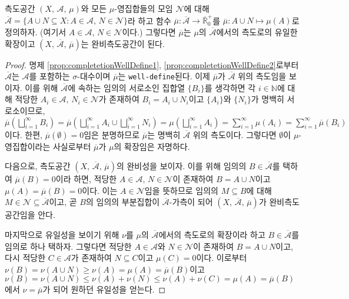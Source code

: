 \begin{theorem}\label{thm:measureCompletion}
    측도공간 $(X,\,\mathcal{A},\,\mu)$와 모든 $\mu$-영집합들의 모임 $\mathcal{N}$에 대해 $\overline{\mathcal{A}}=\{A\cup N\subseteq X:A\in\mathcal{A},\,N\in\mathcal{N}\}$라 하고 함수 $\overline{\mu}:\overline{\mathcal{A}}\to\overline{\mathbb{R}}^+_0$를 $\overline{\mu}:A\cup N\mapsto\mu(A)$로 정의하자. (여기서 $A\in\mathcal{A},\,N\in\mathcal{N}$이다.) 그렇다면 $\overline{\mu}$는 $\mu$의 $\overline{\mathcal{A}}$에서의 측도로의 유일한 확장이고 $(X,\,\overline{\mathcal{A}},\,\overline{\mu})$는 완비측도공간이 된다.
\end{theorem}

\begin{proof}
    명제 \ref{prop:completetionWellDefine1}, \ref{prop:completetionWellDefine2}로부터 $\overline{\mathcal{A}}$는 $\mathcal{A}$를 포함하는 $\sigma$-대수이며 $\overline{\mu}$는 \texttt{well-define}된다. 이제 $\overline{\mu}$가 $\overline{\mathcal{A}}$ 위의 측도임을 보이자. 이를 위해 $\overline{\mathcal{A}}$에 속하는 임의의 서로소인 집합열 $\{B_i\}$를 생각하면 각 $i\in\mathbb{N}$에 대해 적당한 $A_i\in\mathcal{A},\,N_i\in\mathcal{N}$가 존재하여 $B_i=A_i\cup N_i$이고 $\{A_i\}$와 $\{N_i\}$가 명백히 서로소이므로, $\overline{\mu}(\bigsqcup_{i=1}^\infty B_i)=\overline{\mu}(\bigsqcup_{i=1}^\infty A_i\cup\bigsqcup_{i=1}^\infty N_i)=\mu(\bigsqcup_{i=1}^\infty A_i)=\sum_{i=1}^\infty\mu(A_i)=\sum_{i=1}^\infty\overline{\mu}(B_i)$이다. 한편, $\overline{\mu}(\emptyset)=0$임은 분명하므로 $\overline{\mu}$는 명백히  $\overline{\mathcal{A}}$ 위의 측도이다. 그렇다면 $\emptyset$이 $\mu$-영집합이라는 사실로부터  $\overline{\mu}$가 $\mu$의 확장임은 자명하다.

    다음으로, 측도공간 $(X,\,\overline{\mathcal{A}},\,\overline{\mu})$의 완비성을 보이자. 이를 위해 임의의 $B\in\overline{\mathcal{A}}$를 택하여 $\overline{\mu}(B)=0$이라 하면, 적당한 $A\in\mathcal{A},\,N\in\mathcal{N}$이 존재하여 $B=A\cup N$이고 $\mu(A)=\overline{\mu}(B)=0$이다. 이는 $A\in\mathcal{N}$임을 뜻하므로 임의의 $M\subseteq B$에 대해 $M\in\mathcal{N}\subseteq\overline{\mathcal{A}}$이고, 곧 $B$의 임의의 부분집합이 $\overline{\mathcal{A}}$-가측이 되어 $(X,\,\overline{\mathcal{A}},\,\overline{\mu})$가 완비측도공간임을 안다.

    마지막으로 유일성을 보이기 위해 $\nu$를 $\mu$의 $\overline{\mathcal{A}}$에서의 측도로의 확장이라 하고 $B\in\overline{\mathcal{A}}$를 임의로 하나 택하자. 그렇다면 적당한 $A\in\mathcal{A}$와 $N\in\mathcal{N}$이 존재하여 $B=A\cup N$이고, 다시 적당한 $C\in\mathcal{A}$가 존재하여 $N\subseteq C$이고 $\mu(C)=0$이다. 이로부터 $\nu(B)=\nu(A\cup N)\geq\nu(A)=\mu(A)=\overline{\mu}(B)$이고 $\nu(B)=\nu(A\cup N)\leq\nu(A)+\nu(N)\leq\nu(A)+\nu(C)=\mu(A)=\overline{\mu}(B)$에서 $\nu=\overline{\mu}$가 되어 원하던 유일성을 얻는다.
\end{proof}

